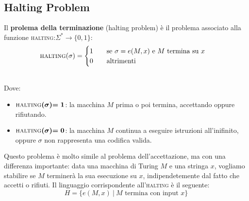\subsection{Halting Problem}
\label{hpro}
\colorbox{SALZO}{\parbox{\dimexpr\linewidth-2\fboxsep}{\begin{definition}
   Il \textbf{prolema della terminazione} (halting problem) è il problema associato alla funzione \textsc{halting}:$\Sigma^*\to \{0,1\}$:
   \[ \textsc{halting}(\sigma) = \begin{cases}
    1 \qquad \text{se } \sigma = e(M,x) \text{ e } M \text{ termina su } x \\
    0 \qquad \text{altrimenti}
   \end{cases}   \]
\end{definition}}}\smallskip\\
Dove:
\begin{itemize}
    \item $\bm{\textsc{halting}(\sigma){= 1}}$: la macchina $M$ prima o poi termina, accettando oppure rifiutando.
    \item $\bm{\textsc{halting}(\sigma){= 0}}$: la macchina $M$ continua a eseguire istruzioni all'inifinito, oppure $\sigma$ non rappresenta una codifica valida.
\end{itemize}
Questo problema è molto simile al problema dell'accettazione, ma con una differenza importante: data una macchina di Turing $M$ e una stringa $x$, vogliamo stabilire se $M$ terminerà la sua esecuzione su $x$, indipendetemente dal fatto che accetti o rifiuti.
Il linguaggio corrispondente all'\textsc{halting} è il seguente:
\[  H = \{  e(M,x) \ | \ M \text{ termina con input } x    \}       \]






